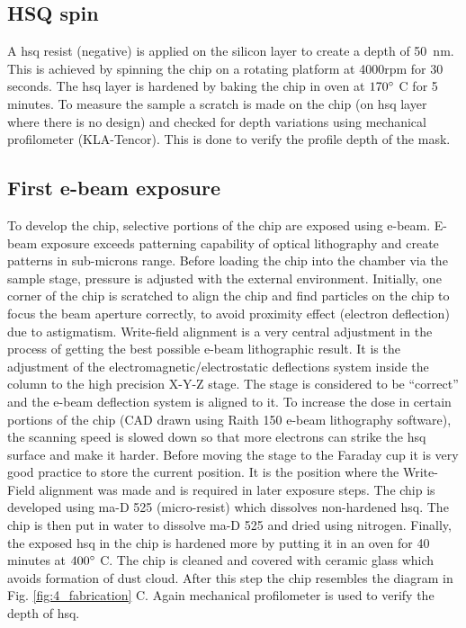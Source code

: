 \documentclass[../report.tex]{subfiles}
\begin{document}
\subsection{HSQ spin}
A \gls{hsq} resist (negative) is applied on the silicon layer to create a depth of \SI{50}{\nano \meter}. This is achieved by spinning the chip on a  rotating platform at 4000rpm for 30 seconds. The \gls{hsq} layer is hardened by baking the chip in oven at $\mathrm{170^{\circ}}$ C for 5 minutes. To measure the sample a scratch is made on the chip (on \gls{hsq} layer where there is no design) and checked for depth variations using mechanical profilometer (KLA-Tencor). This is done to verify the profile depth of the mask.

\subsection{First e-beam exposure}
To develop the chip, selective portions of the chip are exposed using e-beam. E-beam exposure exceeds patterning capability of optical lithography and create patterns in sub-microns range. Before loading the chip into the chamber via the sample stage, pressure is adjusted with the external environment. Initially, one corner of the chip is scratched to align the chip and find particles on the chip to focus the beam aperture correctly, to avoid proximity effect (electron deflection) due to astigmatism. Write-field alignment is a very central adjustment in the process of getting the best possible e-beam lithographic result. It is the adjustment of the electromagnetic/electrostatic deflections system inside the column to the high precision X-Y-Z stage. The stage is considered to be ``correct'' and the e-beam deflection system is aligned to it. To increase the dose in certain portions of the chip (CAD drawn using Raith 150 e-beam lithography software), the scanning speed is slowed down so that more electrons can strike the \gls{hsq} surface and make it harder. Before moving the stage to the Faraday cup it is very good practice to store the current position. It is the position where the Write-Field alignment was made and is required in later exposure steps. The chip is developed using ma-D 525 (micro-resist) which dissolves non-hardened \gls{hsq}. The chip is then put in water to dissolve ma-D 525 and dried using nitrogen. Finally, the exposed \gls{hsq} in the chip is hardened more by putting it in an oven for 40 minutes at $\mathrm{400^{\circ}}$ C. The chip is cleaned and covered with ceramic glass which avoids formation of dust cloud. After this step the chip resembles the diagram in Fig. \ref{fig:4_fabrication} C. Again mechanical profilometer is used to verify the depth of \gls{hsq}.    
\end{document}
